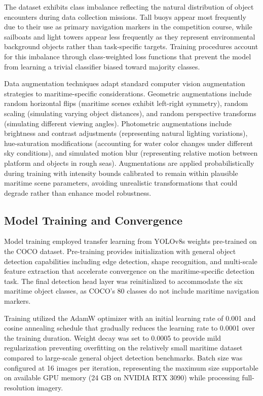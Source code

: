 \documentclass{erauthesis}
\begin{document}
The dataset exhibits class imbalance reflecting the natural distribution of object encounters during data collection missions.
Tall buoys appear most frequently due to their use as primary navigation markers in the competition course, while sailboats and light towers appear less frequently as they represent environmental background objects rather than task-specific targets.
Training procedures account for this imbalance through class-weighted loss functions that prevent the model from learning a trivial classifier biased toward majority classes.

Data augmentation techniques adapt standard computer vision augmentation strategies to maritime-specific considerations.
Geometric augmentations include random horizontal flips (maritime scenes exhibit left-right symmetry), random scaling (simulating varying object distances), and random perspective transforms (simulating different viewing angles).
Photometric augmentations include brightness and contrast adjustments (representing natural lighting variations), hue-saturation modifications (accounting for water color changes under different sky conditions), and simulated motion blur (representing relative motion between platform and objects in rough seas).
Augmentations are applied probabilistically during training with intensity bounds calibrated to remain within plausible maritime scene parameters, avoiding unrealistic transformations that could degrade rather than enhance model robustness.

\subsection{Model Training and Convergence} \label{sec:yolo_training convrg}

Model training employed transfer learning from YOLOv8s weights pre-trained on the COCO dataset.
Pre-training provides initialization with general object detection capabilities including edge detection, shape recognition, and multi-scale feature extraction that accelerate convergence on the maritime-specific detection task.
The final detection head layer was reinitialized to accommodate the six maritime object classes, as COCO's 80 classes do not include maritime navigation markers.

Training utilized the AdamW optimizer with an initial learning rate of 0.001 and cosine annealing schedule that gradually reduces the learning rate to 0.0001 over the training duration.
Weight decay was set to 0.0005 to provide mild regularization preventing overfitting on the relatively small maritime dataset compared to large-scale general object detection benchmarks.
Batch size was configured at 16 images per iteration, representing the maximum size supportable on available GPU memory (24 GB on NVIDIA RTX 3090) while processing full-resolution imagery.
\end{document}
